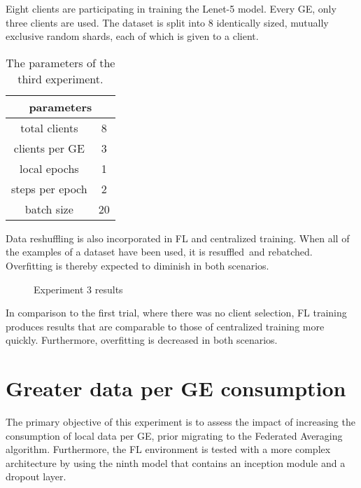 Eight clients are participating in training the Lenet-5 model. Every GE, only three clients are used. The dataset is split into 8 identically sized, mutually exclusive random shards, each of which is given to a client.
\begin{table}[H]
    \center
    \begin{tabular}{ | c | c | }
        \hline
        \multicolumn{2}{|c|}{ parameters } \\
        \hline\hline
         total clients & 8 \\
        \hline
        clients per GE & 3 \\
        \hline
        local epochs & 1 \\
        \hline
        steps per epoch & 2 \\
        \hline
        batch size & 20 \\
        \hline
    \end{tabular}
    \caption[Experiment 3 Parameters]{The parameters of the third experiment.}
    \label{table:Experiment 3 parameters}
\end{table}
Data reshuffling is also incorporated in FL and centralized training. When all of the examples of a dataset have been used, it is resuffled and rebatched. Overfitting is thereby expected to diminish in both scenarios.
\begin{figure}[H]
    \center
    
    \caption[Experiment 3 results]{Experiment 3 results}
    \label{fig:Experiment 3 results}
\end{figure}
In comparison to the first trial, where there was no client selection, FL training produces results that are comparable to those of centralized training more quickly. Furthermore, overfitting is decreased in both scenarios.

\section{Greater data per GE consumption}
The primary objective of this experiment is to assess the impact of increasing the consumption of local data per GE, prior migrating to the Federated Averaging algorithm. Furthermore, the FL environment is tested with a more complex architecture by using the ninth model that contains an inception module and a dropout layer.

